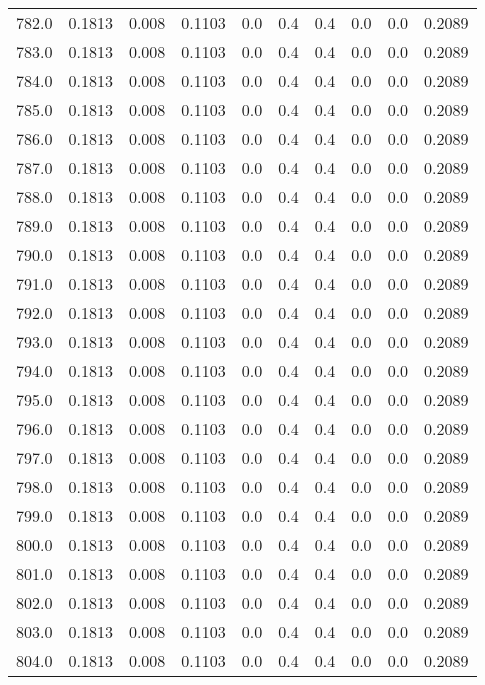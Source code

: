 \begin{longtable}{lrrrrrrrrr}
782.0 & 0.1813 & 0.008 & 0.1103 & 0.0 & 0.4 & 0.4 & 0.0 & 0.0 & 0.2089 \\
783.0 & 0.1813 & 0.008 & 0.1103 & 0.0 & 0.4 & 0.4 & 0.0 & 0.0 & 0.2089 \\
784.0 & 0.1813 & 0.008 & 0.1103 & 0.0 & 0.4 & 0.4 & 0.0 & 0.0 & 0.2089 \\
785.0 & 0.1813 & 0.008 & 0.1103 & 0.0 & 0.4 & 0.4 & 0.0 & 0.0 & 0.2089 \\
786.0 & 0.1813 & 0.008 & 0.1103 & 0.0 & 0.4 & 0.4 & 0.0 & 0.0 & 0.2089 \\
787.0 & 0.1813 & 0.008 & 0.1103 & 0.0 & 0.4 & 0.4 & 0.0 & 0.0 & 0.2089 \\
788.0 & 0.1813 & 0.008 & 0.1103 & 0.0 & 0.4 & 0.4 & 0.0 & 0.0 & 0.2089 \\
789.0 & 0.1813 & 0.008 & 0.1103 & 0.0 & 0.4 & 0.4 & 0.0 & 0.0 & 0.2089 \\
790.0 & 0.1813 & 0.008 & 0.1103 & 0.0 & 0.4 & 0.4 & 0.0 & 0.0 & 0.2089 \\
791.0 & 0.1813 & 0.008 & 0.1103 & 0.0 & 0.4 & 0.4 & 0.0 & 0.0 & 0.2089 \\
792.0 & 0.1813 & 0.008 & 0.1103 & 0.0 & 0.4 & 0.4 & 0.0 & 0.0 & 0.2089 \\
793.0 & 0.1813 & 0.008 & 0.1103 & 0.0 & 0.4 & 0.4 & 0.0 & 0.0 & 0.2089 \\
794.0 & 0.1813 & 0.008 & 0.1103 & 0.0 & 0.4 & 0.4 & 0.0 & 0.0 & 0.2089 \\
795.0 & 0.1813 & 0.008 & 0.1103 & 0.0 & 0.4 & 0.4 & 0.0 & 0.0 & 0.2089 \\
796.0 & 0.1813 & 0.008 & 0.1103 & 0.0 & 0.4 & 0.4 & 0.0 & 0.0 & 0.2089 \\
797.0 & 0.1813 & 0.008 & 0.1103 & 0.0 & 0.4 & 0.4 & 0.0 & 0.0 & 0.2089 \\
798.0 & 0.1813 & 0.008 & 0.1103 & 0.0 & 0.4 & 0.4 & 0.0 & 0.0 & 0.2089 \\
799.0 & 0.1813 & 0.008 & 0.1103 & 0.0 & 0.4 & 0.4 & 0.0 & 0.0 & 0.2089 \\
800.0 & 0.1813 & 0.008 & 0.1103 & 0.0 & 0.4 & 0.4 & 0.0 & 0.0 & 0.2089 \\
801.0 & 0.1813 & 0.008 & 0.1103 & 0.0 & 0.4 & 0.4 & 0.0 & 0.0 & 0.2089 \\
802.0 & 0.1813 & 0.008 & 0.1103 & 0.0 & 0.4 & 0.4 & 0.0 & 0.0 & 0.2089 \\
803.0 & 0.1813 & 0.008 & 0.1103 & 0.0 & 0.4 & 0.4 & 0.0 & 0.0 & 0.2089 \\
804.0 & 0.1813 & 0.008 & 0.1103 & 0.0 & 0.4 & 0.4 & 0.0 & 0.0 & 0.2089 \\

\end{longtable}
